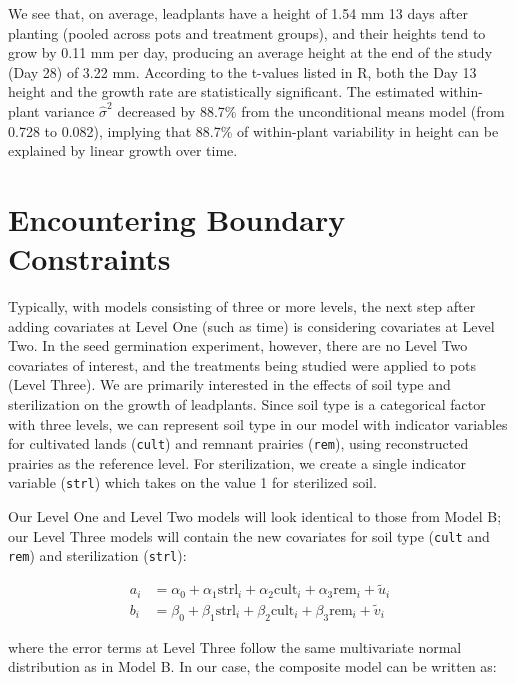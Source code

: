 \documentclass[
]{krantz}
\begin{document}
We see that, on average, leadplants have a height of 1.54 mm 13 days after planting (pooled across pots and treatment groups), and their heights tend to grow by 0.11 mm per day, producing an average height at the end of the study (Day 28) of 3.22 mm. According to the t-values listed in R, both the Day 13 height and the growth rate are statistically significant. The estimated within-plant variance \(\hat{\sigma}^2\) decreased by 88.7\% from the unconditional means model (from 0.728 to 0.082), implying that 88.7\% of within-plant variability in height can be explained by linear growth over time.

\section{Encountering Boundary Constraints}\label{sec:boundary}

Typically, with models consisting of three or more levels, the next step after adding covariates at Level One (such as time) is considering covariates at Level Two. In the seed germination experiment, however, there are no Level Two covariates of interest, and the treatments being studied were applied to pots (Level Three). We are primarily interested in the effects of soil type and sterilization on the growth of leadplants. Since soil type is a categorical factor with three levels, we can represent soil type in our model with indicator variables for cultivated lands (\texttt{cult}) and remnant prairies (\texttt{rem}), using reconstructed prairies as the reference level. For sterilization, we create a single indicator variable (\texttt{strl}) which takes on the value 1 for sterilized soil.

Our Level One and Level Two models will look identical to those from Model B; our Level Three models will contain the new covariates for soil type (\texttt{cult} and \texttt{rem}) and sterilization (\texttt{strl}):

\begin{align*}
a_{i} & = \alpha_{0}+\alpha_{1}\textrm{strl}_{i}+\alpha_{2}\textrm{cult}_{i}+\alpha_{3}\textrm{rem}_{i}+\tilde{u}_{i} \\
b_{i} & = \beta_{0}+\beta_{1}\textrm{strl}_{i}+\beta_{2}\textrm{cult}_{i}+\beta_{3}\textrm{rem}_{i}+\tilde{v}_{i}
\end{align*}

where the error terms at Level Three follow the same multivariate normal distribution as in Model B. In our case, the composite model can be written as:
\end{document}
